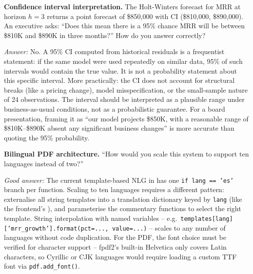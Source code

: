 \begin{challengebox}
\textbf{Confidence interval interpretation.} The Holt-Winters forecast for MRR at horizon $h=3$ returns a point forecast of \$850,000 with CI (\$810,000, \$890,000). An executive asks: ``Does this mean there is a 95\% chance MRR will be between \$810K and \$890K in three months?'' How do you answer correctly?

\smallskip
\textit{Answer:} No. A 95\% CI computed from historical residuals is a frequentist statement: if the same model were used repeatedly on similar data, 95\% of such intervals would contain the true value. It is not a probability statement about this specific interval. More practically: the CI does not account for structural breaks (like a pricing change), model misspecification, or the small-sample nature of 24 observations. The interval should be interpreted as a plausible range under business-as-usual conditions, not as a probabilistic guarantee. For a board presentation, framing it as ``our model projects \$850K, with a reasonable range of \$810K--\$890K absent any significant business changes'' is more accurate than quoting the 95\% probability.
\end{challengebox}

\begin{interviewbox}
\textbf{Bilingual PDF architecture.} ``How would you scale this system to support ten languages instead of two?''

\smallskip
\textit{Good answer:} The current template-based NLG in  has one \texttt{if lang == 'es'} branch per function. Scaling to ten languages requires a different pattern: externalise all string templates into a translation dictionary keyed by \texttt{lang} (like the frontend's ), and parameterise the commentary functions to select the right template. String interpolation with named variables -- e.g.\ \texttt{templates[lang]['mrr\_growth'].format(pct=..., value=...)} -- scales to any number of languages without code duplication. For the PDF, the font choice must be verified for character support -- fpdf2's built-in Helvetica only covers Latin characters, so Cyrillic or CJK languages would require loading a custom TTF font via \texttt{pdf.add\_font()}.
\end{interviewbox}

